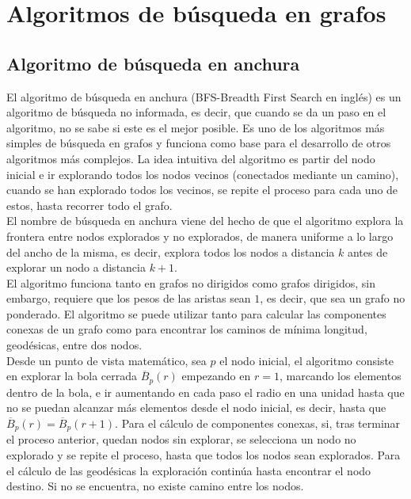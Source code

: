 
\chapter{Algoritmos de búsqueda en grafos}\label{ch:tercer-capitulo}

\section{Algoritmo de búsqueda en anchura}\label{BFS}

El algoritmo de búsqueda en anchura (BFS-Breadth First Search en inglés) es un algoritmo de búsqueda no informada, es decir, que cuando se da un paso en el algoritmo, no se sabe si este es el mejor posible. Es uno de los algoritmos más simples de búsqueda en grafos y funciona como base para el desarrollo de otros algoritmos más complejos. La idea intuitiva del algoritmo es partir del nodo inicial e ir explorando todos los nodos vecinos (conectados mediante un camino), cuando se han explorado todos los vecinos, se repite el proceso para cada uno de estos, hasta recorrer todo el grafo. \\

El nombre de búsqueda en anchura viene del hecho de que el algoritmo explora la frontera entre nodos explorados y no explorados, de manera uniforme a lo largo del ancho de la misma, es decir, explora todos los nodos a distancia $k$ antes de explorar un nodo a distancia $k+1$. \\

El algoritmo funciona tanto en grafos no dirigidos como grafos dirigidos, sin embargo, requiere que los pesos de las aristas sean $1$, es decir, que sea un grafo no ponderado. El algoritmo se puede utilizar tanto para calcular las componentes conexas de un grafo como para encontrar los caminos de mínima longitud, geodésicas, entre dos nodos. \\

Desde un punto de vista matemático, sea $p$ el nodo inicial, el algoritmo consiste en explorar la bola cerrada $\overline B_p(r)$ empezando en $r=1$, marcando los elementos dentro de la bola, e ir aumentando en cada paso el radio en una unidad hasta que no se puedan alcanzar más elementos desde el nodo inicial, es decir, hasta que $\overline B_p(r) = \overline B_p(r+1)$. Para el cálculo de componentes conexas, si, tras terminar el proceso anterior, quedan nodos sin explorar, se selecciona un nodo no explorado y se repite el proceso, hasta que todos los nodos sean explorados. Para el cálculo de las geodésicas la exploración continúa hasta encontrar el nodo destino. Si no se encuentra, no existe camino entre los nodos.

